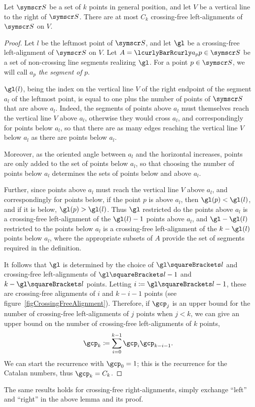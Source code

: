 \documentclass[10pt, a4paper, twoside]{basestyle}
\newcommand{\pointset}{\symscr}
\begin{document}
\begin{lemma}
Let ${\pointset S}$ be a set of $k$ points in general position, and let $V$ be a vertical line to the right of ${\pointset S}$.
There are at most $C_k$ crossing-free left-alignments of ${\pointset S}$ on $V$.
\begin{proof}
Let $l$ be the leftmost point of ${\pointset S}$, and let $\gl$ be a crossing-free left-alignment of ${\pointset S}$ on $V$.
Let $A=\setst{a_p}{p\in{\pointset S}}$ be a set of non-crossing line segments realizing $\gl$.
For a point $p\in{\pointset S}$, we will call $a_p$ \emph{the segment of $p$}.

$\gl(l)$, being the index on the vertical line $V$ of the right endpoint of the segment $a_l$ of the leftmost point,
is equal to one plus the number of points of ${\pointset S}$ that are above $a_l$. Indeed, the segments of points above
$a_l$ must
themselves reach the vertical line $V$ above $a_l$, otherwise they would cross $a_l$, and correspondingly for
points below $a_l$, so that there are as many edges reaching the vertical line $V$ below $a_l$ as there are points
below $a_l$.

Moreover, as the oriented angle between $a_l$ and the horizontal increases, points are only added to the
set of points below $a_l$, so that choosing the number of points below $a_l$ determines the sets of points
below and above $a_l$.

Further, since points above $a_l$ must reach the vertical line $V$ above $a_l$, and correspondingly for points below,
if the point $p$ is above $a_l$, then $\gl(p) < \gl(l)$, and if it is below, $\gl(p) > \gl(l)$. Thus
$\gl$ restricted do the points above $a_l$ is a crossing-free left-alignment of the $\gl(l) - 1$ points above
$a_l$, and $\gl-\gl(l)$ restricted to the points below $a_l$ is a crossing-free left-alignment of the
$k - \gl(l)$ points below $a_l$, where the appropriate subsets of $A$ provide the set of segments required
in the definition.

It follows that $\gl$ is determined by the choice of $\gl\of l$ and crossing-free left-align\-ments
of $\gl\of{l}-1$ and $k-\gl\of{l}$ points.
Letting $i\DefineAs \gl\of l - 1$, these are crossing-free alignments of $i$ and $k-i-1$ points (see
figure~\ref{figCrossingFreeAlignment}).
Therefore, if $\gcp_j$ is an upper bound for the number of crossing-free
left-alignments of $j$ points when $j < k$,
we can give an upper bound on the number of crossing-free left-alignments of $k$ points,
\[\gcp_k\DefineAs\sum{i=0}[k-1]\gcp_{i}\gcp_{k-i-1}\text.\]
We can start the recurrence with $\gcp_0 = 1$; this is the recurrence for the Catalan numbers, thus
$\gcp_k=C_k$.
\end{proof}
\end{lemma}
The same results holds for crossing-free right-alignments, simply exchange ``left'' and ``right'' in the above
lemma and its proof.
\end{document}
